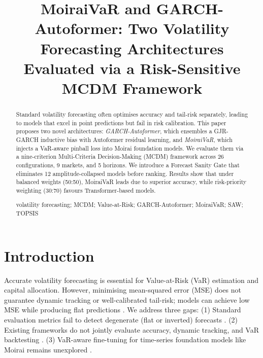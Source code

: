 \documentclass[runningheads,a4paper]{llncs}
\newcommand{\keywords}[1]{\par\addvspace\baselineskip
\noindent\keywordname\enspace\ignorespaces#1}
\begin{document}
\mainmatter

\title{MoiraiVaR and GARCH-Autoformer: Two Volatility Forecasting Architectures Evaluated via a Risk-Sensitive MCDM Framework}


\author{}
\authorrunning{}
\institute{}

\tocauthor{}
\maketitle

\begin{abstract}
Standard volatility forecasting often optimises accuracy and tail-risk separately, leading to models that excel in point predictions but fail in risk calibration. This paper proposes two novel architectures: \emph{GARCH-Autoformer}, which ensembles a GJR-GARCH inductive bias with Autoformer residual learning, and \emph{MoiraiVaR}, which injects a VaR-aware pinball loss into Moirai foundation models. We evaluate them via a nine-criterion Multi-Criteria Decision-Making (MCDM) framework across 26 configurations, 9 markets, and 5 horizons. We introduce a Forecast Sanity Gate that eliminates 12 amplitude-collapsed models before ranking. Results show that under balanced weights (50:50), MoiraiVaR leads due to superior accuracy, while risk-priority weighting (30:70) favours Transformer-based models. 
\keywords{volatility forecasting; MCDM; Value-at-Risk; GARCH-Autoformer; MoiraiVaR; SAW; TOPSIS}
\end{abstract}

\section{Introduction}

Accurate volatility forecasting is essential for Value-at-Risk (VaR) estimation and capital allocation. However, minimising mean-squared error (MSE) does not guarantee dynamic tracking or well-calibrated tail-risk; models can achieve low MSE while producing flat predictions \cite{gneiting2011,patton2011}. We address three gaps: (1) Standard evaluation metrics fail to detect degenerate (flat or inverted) forecasts \cite{zeng2023}. (2) Existing frameworks do not jointly evaluate accuracy, dynamic tracking, and VaR backtesting \cite{hwang1981}. (3) VaR-aware fine-tuning for time-series foundation models like Moirai remains unexplored \cite{liu2025}. 
\end{document}
